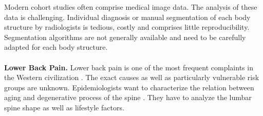 \documentclass[a4paper,twoside]{style/article}
\begin{document}
Modern cohort studies often comprise medical image data.
The analysis of these data is challenging.
Individual diagnosis or manual segmentation of each body structure by radiologists is tedious, costly and comprises little reproducibility.
Segmentation algorithms are not generally available and need to be carefully adapted for each body structure.
\\\\
\noindent \textbf{Lower Back Pain.}
Lower back pain is one of the most frequent complaints in the Western civilization \cite{Hoy2010}.
The exact causes as well as particularly vulnerable risk groups are unknown.
Epidemiologists want to characterize the relation between aging and degenerative process of the spine \cite{Szpalski2005}.
They have to analyze the lumbar spine shape as well as lifestyle factors.
\end{document}
